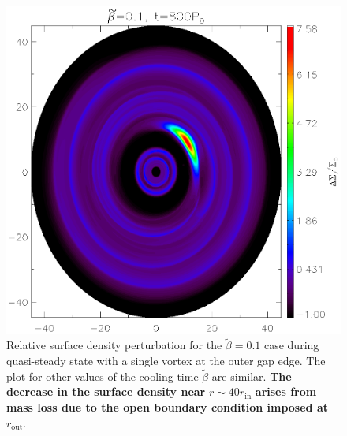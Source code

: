 
\begin{figure}
  \includegraphics[width=\linewidth,height=\linewidth]{figures/vortex2D}
  \caption{Relative surface density perturbation for the
    $\tilde\beta=0.1$ case during quasi-steady state with a single
    vortex at the outer gap edge. The plot for other values of the cooling time
    $\tilde{\beta}$ are similar. {\bf The decrease in the surface
      density near} $r\sim 40 r_\mathrm{in}$ {\bf arises from mass loss due to the open
      boundary condition imposed at} $r_\mathrm{out}$.
    \label{Vortex2D} }
\end{figure}



